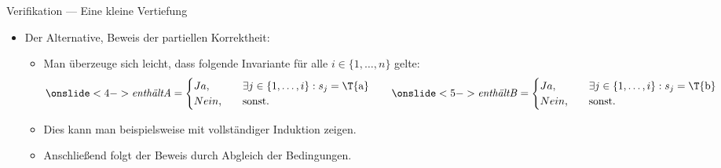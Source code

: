 {\begin{frame}{Verifikation --- Eine kleine Vertiefung}
   \begin{itemize}[<+(1)->]
    \item Der Alternative,  Beweis der partiellen Korrektheit: \begin{itemize}
        \itemsep5pt
        \item Man überzeuge sich leicht, dass folgende Invariante für alle \(i \in \{1, \ldots, n\}\) gelte: \begin{equation*}
            \onslide<4->{\a = \begin{cases}
                Ja, & \exists j \in \{1, \ldots, i\}: s_j = \text{\T{a}}\\
                Nein,\quad & \text{sonst.}
            \end{cases}} \qquad \onslide<5->{\b = \begin{cases}
                Ja, & \exists j \in \{1, \ldots, i\}: s_j = \text{\T{b}}\\
                Nein,\quad & \text{sonst.}
            \end{cases}}\vspace*{-\topsep}
        \end{equation*}
        \item<6-> Dies kann man beispielsweise mit vollständiger Induktion zeigen.
        \item<7-> Anschließend folgt der Beweis durch Abgleich der Bedingungen.
    \end{itemize}
   \end{itemize}
\end{frame}
\fi


}
